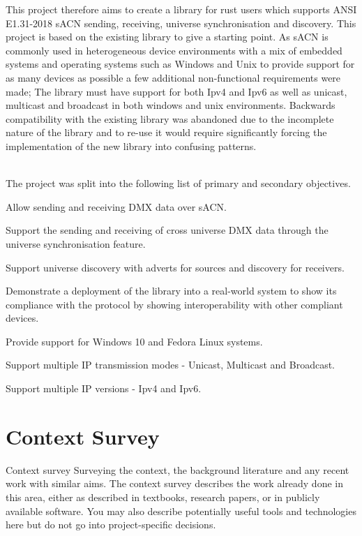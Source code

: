 \documentclass[11pt,a4paper]{report}
\begin{document}
	This project therefore aims to create a library for rust users which supports ANSI E1.31-2018 sACN sending, receiving, universe synchronisation and discovery. This project is based on the existing library to give a starting point. As sACN is commonly used in heterogeneous device environments with a mix of embedded systems and operating systems such as Windows and Unix to provide support for as many devices as possible a few additional non-functional requirements were made; The library must have support for both Ipv4 and Ipv6 as well as unicast, multicast and broadcast in both windows and unix environments. Backwards compatibility with the existing library was abandoned due to the incomplete nature of the library and to re-use it would require significantly forcing the implementation of the new library into confusing patterns.
	
	\\
	
The project was split into the following list of primary and secondary objectives.\\
	\begin{list}{}{Primary}
		\item Allow sending and receiving DMX data over sACN.
		\item Support the sending and receiving of cross universe DMX data through the universe synchronisation feature.
		\item Support universe discovery with adverts for sources and discovery for receivers.
	\end{list}
	\begin{list}{}{Secondary}
		\item Demonstrate a deployment of the library into a real-world system to show its compliance with the protocol by showing interoperability with other compliant devices.
		\item Provide support for Windows 10 and Fedora Linux systems.
		\item Support multiple IP transmission modes - Unicast, Multicast and Broadcast.
		\item Support multiple IP versions - Ipv4 and Ipv6.
	\end{list}
	
	\section{Context Survey}
	Context survey
	Surveying the context, the background literature and
	any recent work with similar aims. The context survey
	describes the work already done in this area, either as
	described in textbooks, research papers, or in publicly
	available software. You may also describe potentially
	useful tools and technologies here but do not go into
	project-specific decisions.
	
\end{document}
